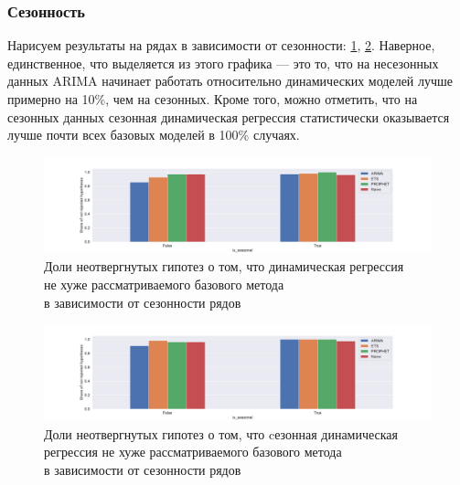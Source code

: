 \documentclass[a4paper,14pt]{extarticle}
\begin{document}
	\subsubsection{Сезонность}
	Нарисуем результаты на рядах в зависимости от сезонности: \ref{results:dynreg:seasonality}, \ref{results:seasdynreg:seasonality}. Наверное, единственное, что выделяется из этого графика --- это то, что на несезонных данных ARIMA начинает работать относительно динамических моделей лучше примерно на 10\%, чем на сезонных. Кроме того, можно отметить, что на сезонных данных сезонная динамическая регрессия статистически оказывается лучше почти всех базовых моделей в 100\% случаях.
	\begin{figure}[!h]
		\captionsetup{justification=centering}
		\centering
		\includegraphics[width=\linewidth]{pictures/results-dynreg-seasonality.pdf}
		\caption{Доли неотвергнутых гипотез о том, что динамическая регрессия \\ не хуже рассматриваемого базового метода \\ в зависимости от сезонности рядов}
		\label{results:dynreg:seasonality}
	\end{figure}
	\begin{figure}[!h]
		\captionsetup{justification=centering}
		\centering
		\includegraphics[width=\linewidth]{pictures/results-seasdynreg-seasonality.pdf}
		\caption{Доли неотвергнутых гипотез о том, что cезонная динамическая регрессия не хуже рассматриваемого базового метода \\ в зависимости от сезонности рядов}
		\label{results:seasdynreg:seasonality}
	\end{figure}
\end{document}
